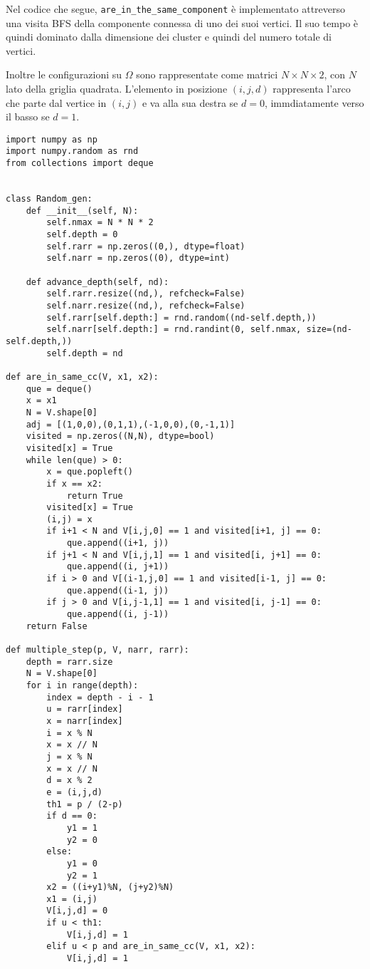 \documentclass[]{marticle}
\begin{document}
Nel codice che segue, \texttt{are\_in\_the\_same\_component} \`e implementato
attreverso una visita BFS della componente connessa di uno dei suoi vertici. Il
suo tempo \`e quindi dominato dalla dimensione dei cluster e quindi del numero
totale di vertici. 

Inoltre le configurazioni su $\Omega$ sono rappresentate come matrici $N\times N
\times 2$, con $N$ lato della griglia quadrata. L'elemento in posizione
$(i,j,d)$ rappresenta l'arco che parte dal vertice in $(i,j)$ e va alla sua
destra se $d=0$, immdiatamente verso il basso se $d=1$.

\begin{lstlisting}
import numpy as np
import numpy.random as rnd
from collections import deque


class Random_gen:
    def __init__(self, N):
        self.nmax = N * N * 2
        self.depth = 0
        self.rarr = np.zeros((0,), dtype=float)
        self.narr = np.zeros((0), dtype=int)

    def advance_depth(self, nd):
        self.rarr.resize((nd,), refcheck=False)
        self.narr.resize((nd,), refcheck=False)
        self.rarr[self.depth:] = rnd.random((nd-self.depth,))
        self.narr[self.depth:] = rnd.randint(0, self.nmax, size=(nd-self.depth,))
        self.depth = nd

def are_in_same_cc(V, x1, x2):
    que = deque()
    x = x1
    N = V.shape[0]
    adj = [(1,0,0),(0,1,1),(-1,0,0),(0,-1,1)]
    visited = np.zeros((N,N), dtype=bool)
    visited[x] = True
    while len(que) > 0:
        x = que.popleft()
        if x == x2:
            return True
        visited[x] = True
        (i,j) = x
        if i+1 < N and V[i,j,0] == 1 and visited[i+1, j] == 0:
            que.append((i+1, j))
        if j+1 < N and V[i,j,1] == 1 and visited[i, j+1] == 0:
            que.append((i, j+1))
        if i > 0 and V[(i-1,j,0] == 1 and visited[i-1, j] == 0:
            que.append((i-1, j))
        if j > 0 and V[i,j-1,1] == 1 and visited[i, j-1] == 0:
            que.append((i, j-1))
    return False

def multiple_step(p, V, narr, rarr):
    depth = rarr.size
    N = V.shape[0]
    for i in range(depth):
        index = depth - i - 1
        u = rarr[index]
        x = narr[index]
        i = x % N
        x = x // N
        j = x % N
        x = x // N
        d = x % 2
        e = (i,j,d)
        th1 = p / (2-p)
        if d == 0:
            y1 = 1
            y2 = 0
        else:
            y1 = 0
            y2 = 1
        x2 = ((i+y1)%N, (j+y2)%N)
        x1 = (i,j)
        V[i,j,d] = 0
        if u < th1:
            V[i,j,d] = 1
        elif u < p and are_in_same_cc(V, x1, x2):
            V[i,j,d] = 1


\end{lstlisting}
\end{document}

